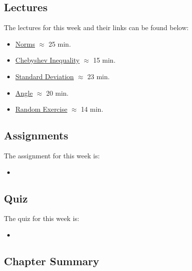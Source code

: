 \subsection{Lectures}

The lectures for this week and their links can be found below:

\begin{itemize}
    \item \href{https://applied.cs.colorado.edu/mod/hvp/view.php?id=50692}{Norms} $\approx$ 25 min.
    \item \href{https://applied.cs.colorado.edu/mod/hvp/view.php?id=50693}{Chebyshev Inequality} $\approx$ 15 min.
    \item \href{https://applied.cs.colorado.edu/mod/hvp/view.php?id=50694}{Standard Deviation} $\approx$ 23 min.
    \item \href{https://applied.cs.colorado.edu/mod/hvp/view.php?id=50695}{Angle} $\approx$ 20 min.
    \item \href{https://applied.cs.colorado.edu/mod/hvp/view.php?id=50696}{Random Exercise} $\approx$ 14 min.
\end{itemize}

\subsection{Assignments}

The assignment for this week is:

\begin{itemize}
    \item {}
\end{itemize}

\subsection{Quiz}

The quiz for this week is:

\begin{itemize}
    \item {}
\end{itemize}

\subsection{Chapter Summary}

